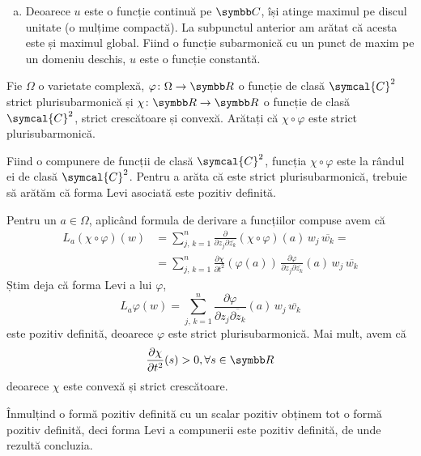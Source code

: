 \begin{solution}
\begin{enumerate}[a)]
    \item Deoarece \(u\) este o funcție continuă pe \(\complex\), își atinge maximul pe discul unitate (o mulțime compactă). La subpunctul anterior am arătat că acesta este și maximul global. Fiind o funcție subarmonică cu un punct de maxim pe un domeniu deschis, \(u\) este o funcție constantă.
\end{enumerate}
\end{solution}

\begin{problem}
Fie \(\Omega\) o varietate complexă, \(\varphi \colon \Omega \to \reals\) o funcție de clasă \(\symcal{C}^2\) strict plurisubarmonică și \(\chi \colon \reals \to \reals\) o funcție de clasă \(\symcal{C}^2\), strict crescătoare și convexă. Arătați că \(\chi \circ \varphi\) este strict plurisubarmonică.
\end{problem}
\begin{solution}
Fiind o compunere de funcții de clasă \(\symcal{C}^2\), funcția \(\chi \circ \varphi\) este la rândul ei de clasă \(\symcal{C}^2\). Pentru a arăta că este strict plurisubarmonică, trebuie să arătăm că forma Levi asociată este pozitiv definită.

Pentru un \(a \in \Omega\), aplicând formula de derivare a funcțiilor compuse avem că
\begin{align*}
    L_a \left(\chi \circ \varphi\right) (w) &= \sum_{j, \, k = 1}^{n} \frac{\partial}{\partial z_j \partial \overline{z_k}} \left(\chi \circ \varphi\right) (a) \, w_j \, \overline{w_k} = \\
    &= \sum_{j, \, k = 1}^{n} \frac{\partial \chi}{\partial t^2} \left(\varphi(a)\right) \, \frac{\partial \varphi}{\partial z_j \partial \overline{z_k}} (a) \, w_j \, \overline{w_k}
\end{align*}
Știm deja că forma Levi a lui \(\varphi\),
\[
    L_a \varphi (w) = \sum_{j, \, k = 1}^{n} \frac{\partial \varphi}{\partial z_j \overline{\partial z_k}} (a) \, w_j \, \overline{w_k}
\]
este pozitiv definită, deoarece \(\varphi\) este strict plurisubarmonică. Mai mult, avem că
\[
    \frac{\partial \chi}{\partial t^2}(s) > 0, \forall s \in \reals
\]
deoarece \(\chi\) este convexă și strict crescătoare.

Înmulțind o formă pozitiv definită cu un scalar pozitiv obținem tot o formă pozitiv definită, deci forma Levi a compunerii este pozitiv definită, de unde rezultă concluzia.
\end{solution}

